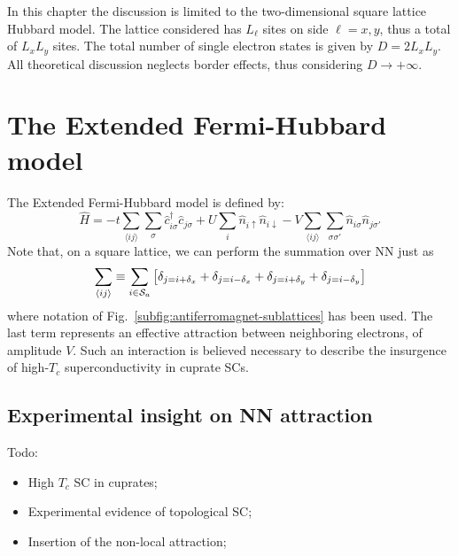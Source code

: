 In this chapter the discussion is limited to the two-dimensional square lattice Hubbard model. The lattice considered has $L_\ell$ sites on side $\ell = x,y$, thus a total of $L_x L_y$ sites. The total number of single electron states is given by $D = 2L_x L_y$. All theoretical discussion neglects border effects, thus considering $D \to +\infty$.

\section{The Extended Fermi-Hubbard model}

The Extended Fermi-Hubbard model is defined by:
\begin{equation}\label{eq:extended-hubbard-model}
	\hat H =
	-t \sum_{\langle ij \rangle} \sum_\sigma \hat c_{i\sigma}^\dagger \hat c_{j\sigma}
	+ U \sum_i \hat n_{i\uparrow} \hat n_{i\downarrow}
	- V \sum_{\langle ij \rangle} \sum_{\sigma \sigma'} \hat n_{i\sigma} \hat n_{j\sigma'}
\end{equation}
Note that, on a square lattice, we can perform the summation over NN just as
\[
	\sum_{\ev{ij}} \equiv \sum_{i \in \mathcal{S}_a} \left[
		\delta_{j=i+\delta_x} + \delta_{j=i-\delta_x} + \delta_{j=i+\delta_y} + \delta_{j=i-\delta_y}
	\right]
\]
where notation of Fig.~\ref{subfig:antiferromagnet-sublattices} has been used. The last term represents an effective attraction between neighboring electrons, of amplitude $V$. Such an interaction is believed \cite{cao2025p-wave} necessary to describe the insurgence of high-$T_c$ superconductivity in cuprate SCs. \todo

\subsection{Experimental insight on NN attraction}

{\color{tabred}Todo:
\begin{itemize}
	\item High $T_c$ SC in cuprates;
	\item Experimental evidence of topological SC;
	\item Insertion of the non-local attraction;
\end{itemize}}


